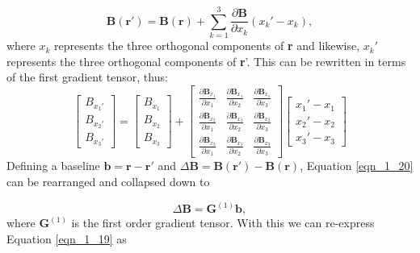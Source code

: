 \begin{equation}
\mathbf{B}(\mathbf{r}') = \mathbf{B}(\mathbf{r})+\sum_{k=1}^{3}\frac{\partial \mathbf{B}}{\partial x_k}(x_k'-x_k), 
\end{equation} where $x_k$ represents the three orthogonal components of \textbf{r} and likewise, $x_k'$ represents the three orthogonal components of \textbf{r}'. This can be rewritten in terms of the first gradient tensor, thus:
\begin{equation}
\begin{bmatrix}
B_{x_1'} \\ B_{x_2'} \\ B_{x_3'}
\end{bmatrix} 
= \begin{bmatrix}
B_{x_1} \\ B_{x_2} \\ B_{x_3}
\end{bmatrix}
+ \begin{bmatrix}
\frac{\partial \mathbf{B}_{x_1}}{\partial x_1} & \frac{\partial \mathbf{B}_{x_1}}{\partial x_2} & \frac{\partial \mathbf{B}_{x_1}}{\partial x_3} \\
\frac{\partial \mathbf{B}_{x_2}}{\partial x_1} & \frac{\partial \mathbf{B}_{x_2}}{\partial x_2} & \frac{\partial \mathbf{B}_{x_2}}{\partial x_3} \\
\frac{\partial \mathbf{B}_{x_3}}{\partial x_1} & \frac{\partial \mathbf{B}_{x_3}}{\partial x_2} & \frac{\partial \mathbf{B}_{x_3}}{\partial x_3} 
\end{bmatrix}
\begin{bmatrix}
x_1' - x_1 \\ x_2' - x_2 \\ x_3' - x_3
\end{bmatrix} \label{eqn_1_20}
\end{equation} Defining a baseline $\mathbf{b} = \mathbf{r}-\mathbf{r}'$ and $\Delta\mathbf{B} = \mathbf{B}(\mathbf{r}')-\mathbf{B}(\mathbf{r})$, Equation \ref{eqn_1_20} can be rearranged and collapsed down to

\begin{equation}
\Delta \mathbf{B} = \mathbf{G}^{(1)}\mathbf{b},
\end{equation} where $\mathbf{G}^{(1)}$ is the first order gradient tensor. With this we can re-express Equation \ref{eqn_1_19} as

